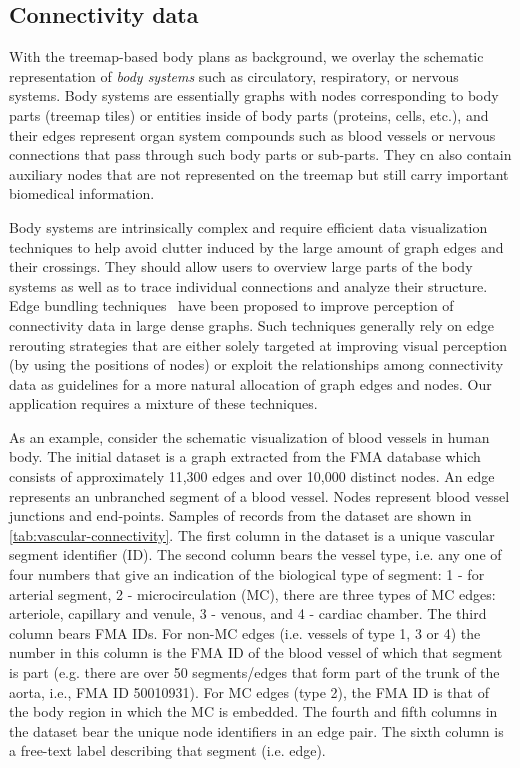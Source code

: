 \subsection{Connectivity data} %

With the treemap-based body plans as background, we overlay the schematic representation of \emph{body systems} such as circulatory, respiratory, or nervous systems. Body systems are essentially graphs with nodes corresponding to body parts (treemap tiles) or entities inside of body parts (proteins, cells, etc.), and their edges represent organ system compounds such as blood vessels or nervous connections that pass through such body parts or sub-parts.
They cn also contain auxiliary nodes that are not represented on the treemap but still carry important biomedical information. 

Body systems are intrinsically complex and require efficient data visualization techniques to help avoid clutter induced by the large amount of graph edges and their crossings. They should allow users to overview large parts of the body systems as well as to trace individual connections and analyze their structure. Edge bundling techniques~\cite{Hol06,GHN+11,HET12} have been proposed to improve perception of connectivity data in large dense graphs.
Such techniques generally rely on edge rerouting strategies that are either solely targeted at improving visual perception (by using the positions of nodes) or exploit the relationships among connectivity data as guidelines for a more natural allocation of graph edges and nodes. Our application requires a mixture of these techniques.

As an example, consider the schematic visualization of blood vessels in human body.
The initial dataset is a graph extracted from the FMA database which consists of approximately 11,300 edges and over 10,000 distinct nodes.
An edge represents an unbranched segment of a blood vessel. Nodes represent blood vessel junctions and end-points.
Samples of records from the dataset are shown in \cref{tab:vascular-connectivity}. The first column in the dataset is a unique vascular segment identifier (ID). The second column bears the vessel type, i.e. any one of four numbers that give  an indication of the biological type of segment:
1 - for arterial segment, 2 - microcirculation (MC), there are three types of MC edges: arteriole, capillary and venule, 3 - venous, and 4 - cardiac chamber.
The third column bears FMA IDs. For non-MC edges (i.e. vessels of type 1, 3 or 4) the number in this column is the FMA ID of the blood vessel of
which that segment is part (e.g. there are over 50 segments/edges that form part of the trunk of the aorta, i.e., FMA ID 50010931). For MC edges (type 2), the FMA ID is that of the body region in which the MC is embedded. The fourth and fifth columns in the dataset bear the unique node identifiers in an edge pair.
The sixth column is a free-text label describing that segment (i.e. edge).


